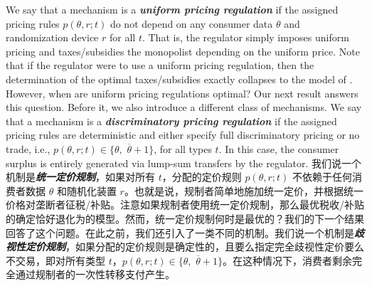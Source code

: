 \documentclass[12pt,letterpaper]{article}
\newenvironment{original}{\color{black}\noindent}{}
\newenvironment{translation}{\color{blue}\noindent}{}
\theoremstyle{plain}
\theoremstyle{definition}
\theoremstyle{remark}
\renewcommand{\1}{\mathds{1}}
\theoremstyle{definition}
\begin{document}
\begin{original}
We say that a mechanism is a \textit{\textbf{uniform pricing regulation}} if the assigned pricing rules $p(\theta, r; t)$ do not depend on any consumer data $\theta$ and randomization device $r$ for all $t$. That is, the regulator simply imposes uniform pricing and taxes/subsidies the monopolist depending on the uniform price. Note that if the regulator were to use a uniform pricing regulation, then the determination of the optimal taxes/subsidies exactly collapses to the model of \citet{Baron1982RegulatingCosts}. However, when are uniform pricing regulations optimal? Our next result answers this question. Before it, we also introduce a different class of mechanisms. We say that a mechanism is a \textit{\textbf{discriminatory pricing regulation}} if the assigned pricing rules are deterministic and either specify full discriminatory pricing or no trade, i.e., $p(\theta, r; t) \in \big\{\theta,\,\, \overline{\theta} + 1\big\}$, for all types $t$. In this case, the consumer surplus is entirely generated via lump-sum transfers by the regulator.
\end{original}
\begin{translation}
我们说一个机制是\textit{\textbf{统一定价规制}}，如果对所有 $t$，分配的定价规则 $p(\theta, r; t)$ 不依赖于任何消费者数据 $\theta$ 和随机化装置 $r$。也就是说，规制者简单地施加统一定价，并根据统一价格对垄断者征税/补贴。注意如果规制者使用统一定价规制，那么最优税收/补贴的确定恰好退化为\citet{Baron1982RegulatingCosts}的模型。然而，统一定价规制何时是最优的？我们的下一个结果回答了这个问题。在此之前，我们还引入了一类不同的机制。我们说一个机制是\textit{\textbf{歧视性定价规制}}，如果分配的定价规则是确定性的，且要么指定完全歧视性定价要么不交易，即对所有类型 $t$，$p(\theta, r; t) \in \big\{\theta,\,\, \overline{\theta} + 1\big\}$。在这种情况下，消费者剩余完全通过规制者的一次性转移支付产生。
\end{translation}
\end{document}
